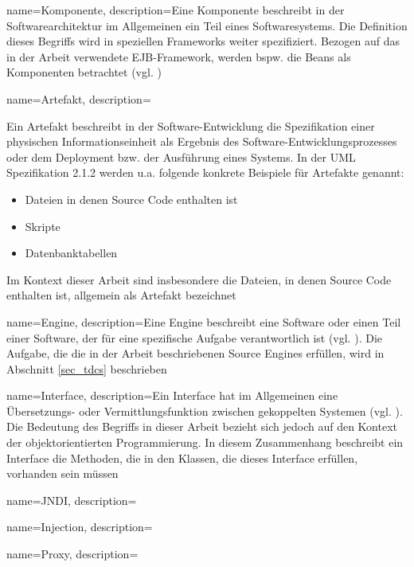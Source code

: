 

{
    name=Komponente,
    description={Eine Komponente beschreibt in der Softwarearchitektur im Allgemeinen ein Teil eines Softwaresystems. Die Definition dieses Begriffs wird in speziellen Frameworks weiter spezifiziert. Bezogen auf das in der Arbeit verwendete EJB-Framework, werden bspw. die Beans als Komponenten betrachtet (vgl. \cite{ejbspec})}
}
{
    name=Artefakt,
    description={Ein Artefakt beschreibt in der Software-Entwicklung die Spezifikation einer physischen Informationseinheit als Ergebnis des Software-Entwicklungsprozesses oder dem Deployment bzw. der Ausführung eines Systems. In der UML Spezifikation 2.1.2 \cite{uml} werden u.a. folgende konkrete Beispiele für Artefakte genannt:
    \begin{itemize}
    \item Dateien in denen Source Code enthalten ist
    \item Skripte
    \item Datenbanktabellen    
    \end{itemize}
    \noindent
    Im Kontext dieser Arbeit sind insbesondere die Dateien, in denen Source Code enthalten ist, allgemein als Artefakt bezeichnet}
}


{
    name=Engine,
    description={Eine Engine beschreibt eine Software oder einen Teil einer Software, der für eine spezifische Aufgabe verantwortlich ist (vgl. \cite{pcmag}). Die Aufgabe, die die in der Arbeit beschriebenen Source Engines erfüllen, wird in Abschnitt \ref{sec_tdcs} beschrieben}
}


{
    name=Interface,
    description={Ein Interface hat im Allgemeinen eine Übersetzungs- oder Vermittlungsfunktion zwischen gekoppelten Systemen (vgl. \cite{interfaces}). Die Bedeutung des Begriffs in dieser Arbeit bezieht sich jedoch auf den Kontext der objektorientierten Programmierung. In diesem Zusammenhang beschreibt ein Interface die Methoden, die in den Klassen, die dieses Interface erfüllen, vorhanden sein müssen}
}

{
    name=JNDI,
    description={}
}


{
    name=Injection,
    description={}
}


{
    name=Proxy,
    description={}
}